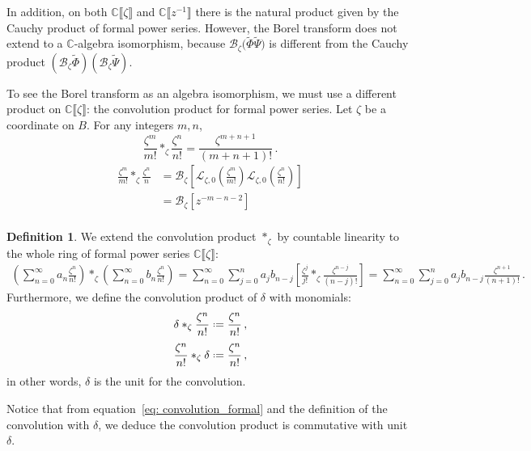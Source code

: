 \documentclass{article}
\newcommand{\C}{\mathbb{C}}
\newcommand{\series}[1]{\tilde{#1}}
\newcommand*{\defeq}{\mathrel{\vcenter{\baselineskip0.5ex \lineskiplimit0pt
                     \hbox{\scriptsize.}\hbox{\scriptsize.}}}%
                     =}
\newcommand{\laplace}{\mathcal{L}}
\newcommand{\borel}{\mathcal{B}}
\theoremstyle{definition}
\newtheorem{definition}{Definition}[section]
\theoremstyle{plain}
\newenvironment{verify}{\color{ForestGreen}}{\color{black}}
\begin{document}
In addition, on both $\C\llbracket\zeta\rrbracket$ and $\C\llbracket z^{-1}\rrbracket$ there is the natural product given by the Cauchy product of formal power series. However, the Borel transform does not extend to a $\C$-algebra isomorphism, because $\borel_\zeta\big(\series{\Phi}\series{\Psi}\big)$ is different from the Cauchy product $(\borel_\zeta \series{\Phi})(\borel_\zeta \series{\Psi})$.

To see the Borel transform as an algebra isomorphism, we must use a different product on $\C\llbracket\zeta\rrbracket$: the convolution product for formal power series. Let $\zeta$ be a coordinate on $B$. For any integers $m, n$,%
\begin{equation}\label{eq: convolution_formal}
\frac{\zeta^m}{m!} \ast_{\zeta} \frac{\zeta^n}{n!} = \frac{\zeta^{m+n+1}}{(m+n+1)!} \,.
\end{equation}
\begin{verify}
\begin{align*}
\frac{\zeta^m}{m!} \ast_\zeta \frac{\zeta^n}{n} & = \borel_\zeta \left[ \laplace_{\zeta, 0}\left(\frac{\zeta^m}{m!}\right) \laplace_{\zeta, 0} \left(\frac{\zeta^n}{n!}\right) \right] \\
& = \borel_\zeta[z^{-m-n-2}] \\
\end{align*}
\end{verify}
\begin{definition}\label{def:convolution_formal}
We extend the convolution product $\ast_\zeta$ by countable linearity to the whole ring of formal power series $\C\llbracket\zeta\rrbracket$:
\begin{align*}
   \left( \sum_{n=0}^\infty a_n \frac{\zeta^n}{n!}\right)\ast_\zeta\left(\sum_{n=0}^\infty b_n\frac{\zeta^n}{n!}\right)=\sum_{n=0}^\infty\sum_{j=0}^na_jb_{n-j}\left[\frac{\zeta^j}{j!}\ast_\zeta\frac{\zeta^{n-j}}{(n-j)!}\right]=\sum_{n=0}^\infty\sum_{j=0}^na_jb_{n-j}\frac{\zeta^{n+1}}{(n+1)!}\,.
\end{align*}
Furthermore, we define the convolution product of $\delta$ with monomials: \[\delta\ast_{\zeta}\frac{\zeta^n}{n!}\defeq\frac{\zeta^n}{n!}\,,\]
\[\frac{\zeta^n}{n!}\ast_{\zeta}\delta\defeq\frac{\zeta^n}{n!}\,,\]
in other words, $\delta$ is the unit for the convolution. 
\end{definition}
Notice that from equation~\eqref{eq: convolution_formal} and the definition of the convolution with $\delta$, we deduce the convolution product is commutative with unit $\delta$.
\end{document}

